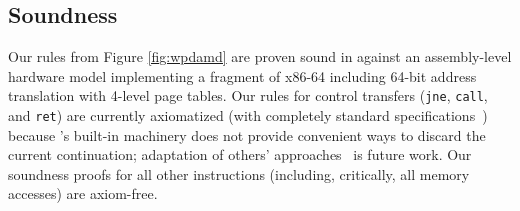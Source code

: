 \subsection{Soundness}
\label{sec:soundness}
Our rules from Figure \ref{fig:wpdamd} are proven sound in \iris against an assembly-level hardware model
implementing a fragment of x86-64 including 64-bit address translation with 4-level page tables.
Our rules for control transfers (\lstinline|jne|, \lstinline|call|, and \lstinline|ret|) are currently
axiomatized (with completely standard specifications~\cite{ni2007contexts,Chlipala2013Bedrock}) 
because \iris's built-in machinery does not provide
convenient ways to discard the current continuation; adaptation of others'
approaches~\cite{de2023type} is future work.
Our soundness proofs for all other instructions (including, critically, all memory accesses)
are axiom-free.
